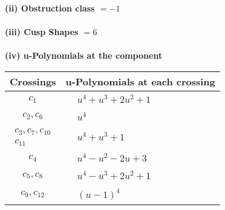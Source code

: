 \documentclass[1p]{elsarticle_modified}
\theoremstyle{definition}
\begin{document}
\flushleft \textbf{(ii) Obstruction class $= -1$}\\~\\
\flushleft \textbf{(iii) Cusp Shapes $= 6$}\\~\\
\newpage\renewcommand{\arraystretch}{1}
\flushleft \textbf{(iv) u-Polynomials at the component}\newline \\
\begin{tabular}{m{50pt}|m{274pt}}
Crossings & \hspace{64pt}u-Polynomials at each crossing \\
\hline $$\begin{aligned}c_{1}\end{aligned}$$&$\begin{aligned}
&u^4+u^3+2 u^2+1
\end{aligned}$\\
\hline $$\begin{aligned}c_{2},c_{6}\end{aligned}$$&$\begin{aligned}
&u^4
\end{aligned}$\\
\hline $$\begin{aligned}c_{3},c_{7},c_{10}\\c_{11}\end{aligned}$$&$\begin{aligned}
&u^4+u^3+1
\end{aligned}$\\
\hline $$\begin{aligned}c_{4}\end{aligned}$$&$\begin{aligned}
&u^4- u^2-2 u+3
\end{aligned}$\\
\hline $$\begin{aligned}c_{5},c_{8}\end{aligned}$$&$\begin{aligned}
&u^4- u^3+2 u^2+1
\end{aligned}$\\
\hline $$\begin{aligned}c_{9},c_{12}\end{aligned}$$&$\begin{aligned}
&(u-1)^4
\end{aligned}$\\
\hline
\end{tabular}\\~\\
\end{document}
